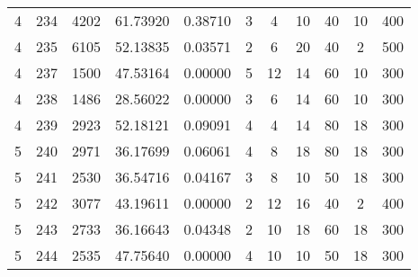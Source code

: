 \begin{table}[h]
\begin{tabular}{ccccccccccc}
        4   &234	&4202	&61.73920	&0.38710	&3	&4	&10	&40	&10	&400\\
        4   &235	&6105	&52.13835	&0.03571	&2	&6	&20	&40	&2	&500\\
        4   &237	&1500	&47.53164	&0.00000	&5	&12	&14	&60	&10	&300\\
        4   &238	&1486	&28.56022	&0.00000	&3	&6	&14	&60	&10	&300\\
        4   &239	&2923	&52.18121	&0.09091	&4	&4	&14	&80	&18	&300\\

        5   &240	&2971	&36.17699	&0.06061	&4	&8	&18	&80	&18	&300\\
        5   &241	&2530	&36.54716	&0.04167	&3	&8	&10	&50	&18	&300\\
        5   &242	&3077	&43.19611	&0.00000	&2	&12	&16	&40	&2	&400\\
        5   &243	&2733	&36.16643	&0.04348	&2	&10	&18	&60	&18	&300\\
        5   &244	&2535	&47.75640	&0.00000	&4	&10	&10	&50	&18	&300\\
    \hline\hline
	\end{tabular}
\end{table}

